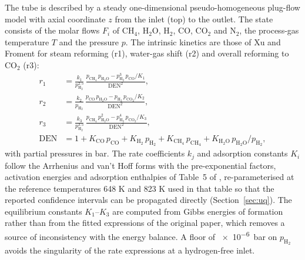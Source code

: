 The tube is described by a steady one-dimensional pseudo-homogeneous plug-flow model with axial coordinate $z$ from the inlet
(top) to the outlet. The state consists of the molar flows $F_i$ of CH$_4$, H$_2$O, H$_2$, CO, CO$_2$ and N$_2$, the process-gas
temperature $T$ and the pressure $p$. The intrinsic kinetics are those of Xu and Froment \cite{xu1989a} for steam reforming (r1),
water-gas shift (r2) and overall reforming to CO$_2$ (r3):
\begin{align}
r_1 &= \frac{k_1}{p_{\mathrm{H_2}}^{2.5}}\,\frac{p_{\mathrm{CH_4}}\,p_{\mathrm{H_2O}} - p_{\mathrm{H_2}}^{3}\,p_{\mathrm{CO}}/K_1}{\mathrm{DEN}^2}, \\
r_2 &= \frac{k_2}{p_{\mathrm{H_2}}}\,\frac{p_{\mathrm{CO}}\,p_{\mathrm{H_2O}} - p_{\mathrm{H_2}}\,p_{\mathrm{CO_2}}/K_2}{\mathrm{DEN}^2}, \\
r_3 &= \frac{k_3}{p_{\mathrm{H_2}}^{3.5}}\,\frac{p_{\mathrm{CH_4}}\,p_{\mathrm{H_2O}}^{2} - p_{\mathrm{H_2}}^{4}\,p_{\mathrm{CO_2}}/K_3}{\mathrm{DEN}^2}, \\
\mathrm{DEN} &= 1 + K_{\mathrm{CO}}\,p_{\mathrm{CO}} + K_{\mathrm{H_2}}\,p_{\mathrm{H_2}} + K_{\mathrm{CH_4}}\,p_{\mathrm{CH_4}} + K_{\mathrm{H_2O}}\,p_{\mathrm{H_2O}}/p_{\mathrm{H_2}},
\end{align}
with partial pressures in bar. The rate coefficients $k_j$ and adsorption constants $K_i$ follow the Arrhenius and van't Hoff forms
with the pre-exponential factors, activation energies and adsorption enthalpies of Table~5 of \cite{xu1989a}, re-parameterised at
the reference temperatures 648 K and 823 K used in that table so that the reported confidence intervals can be propagated directly
(Section~\ref{sec:uq}). The equilibrium constants $K_1$--$K_3$ are computed from Gibbs energies of formation rather than from the
fitted expressions of the original paper, which removes a source of inconsistency with the energy balance. A floor of
\SI{e-6}{bar} on $p_{\mathrm{H_2}}$ avoids the singularity of the rate expressions at a hydrogen-free inlet.

